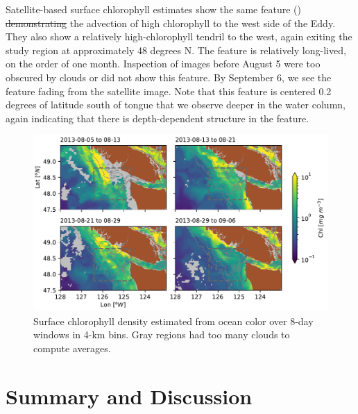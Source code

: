\documentclass[draft]{agujournal2019}
\newcommand*{\Eddy}{{\sc Eddy}}
\providecommand{\DIFadd}[1]{{\protect\color{blue}\uwave{#1}}} %
\providecommand{\DIFdel}[1]{{\protect\color{red}\sout{#1}}}                      %
\providecommand{\DIFaddbegin}{} %
\providecommand{\DIFaddend}{} %
\providecommand{\DIFdelbegin}{} %
\providecommand{\DIFdelend}{} %
\begin{document}
Satellite-based surface chlorophyll estimates show the same feature () \DIFdelbegin \DIFdel{demonstrating }\DIFdelend \DIFaddbegin \DIFadd{suggesting }\DIFaddend the advection of high chlorophyll to the west side of the \Eddy. They also show a relatively high-chlorophyll tendril to the west, again exiting the study region at approximately 48 degrees N.  The feature is relatively long-lived, on the order of one month.  Inspection of images before August 5 were too obscured by clouds or did not show this feature.  By September 6, we see the feature fading from the satellite image.  Note that this feature is centered 0.2 degrees of latitude south of tongue that we observe deeper in the water column, again indicating that there is depth-dependent structure in the feature.

\begin{figure}[htbp]
  \begin{center}
    \includegraphics[width=6.2in]{ChlA}
    \caption{Surface chlorophyll density estimated from ocean color \cite{Huetal12,MODISChlL3} over 8-day windows in 4-km bins. Gray regions had too many clouds to compute averages.
      \label{fig:ChlA} }
  \end{center}
\end{figure}


\section{Summary and Discussion}
\label{sec:Summary}
\end{document}
